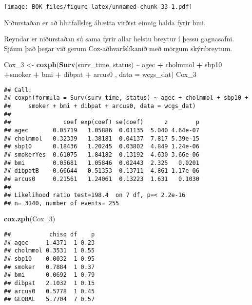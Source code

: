 \documentclass[
]{book}
\newenvironment{Shaded}{\begin{snugshade}}{\end{snugshade}}
\newcommand{\DataTypeTok}[1]{\textcolor[rgb]{0.13,0.29,0.53}{#1}}
\newcommand{\DecValTok}[1]{\textcolor[rgb]{0.00,0.00,0.81}{#1}}
\newcommand{\KeywordTok}[1]{\textcolor[rgb]{0.13,0.29,0.53}{\textbf{#1}}}
\newcommand{\NormalTok}[1]{#1}
\newcommand{\OperatorTok}[1]{\textcolor[rgb]{0.81,0.36,0.00}{\textbf{#1}}}
\newcommand{\StringTok}[1]{\textcolor[rgb]{0.31,0.60,0.02}{#1}}
\begin{document}
\texttt{[image: BOK\_files/figure-latex/unnamed-chunk-33-1.pdf]}

Niðurstaðan er að hlutfallsleg áhætta virðist einnig halda fyrir bmi.

Reyndar er niðurstaðan sú sama fyrir allar helstu breytur í þessu gagnasafni. Sjáum það þegar við gerum Cox-aðhvarfslíkanið með mörgum skýribreytum.

\begin{Shaded}
\begin{Highlighting}[]
\NormalTok{Cox\_}\DecValTok{3}\NormalTok{ <{-}}\StringTok{ }\KeywordTok{coxph}\NormalTok{(}\KeywordTok{Surv}\NormalTok{(surv\_time, status) }\OperatorTok{\textasciitilde{}}\StringTok{  }\NormalTok{agec }\OperatorTok{+}\StringTok{ }\NormalTok{cholmmol }\OperatorTok{+}\StringTok{ }\NormalTok{sbp10 }\OperatorTok{+}\NormalTok{smoker }\OperatorTok{+}\StringTok{ }\NormalTok{bmi  }\OperatorTok{+}\StringTok{ }\NormalTok{dibpat }\OperatorTok{+}\StringTok{ }\NormalTok{arcus0  , }\DataTypeTok{data =}\NormalTok{ wcgs\_dat)}
\NormalTok{Cox\_}\DecValTok{3}
\end{Highlighting}
\end{Shaded}

\begin{verbatim}
## Call:
## coxph(formula = Surv(surv_time, status) ~ agec + cholmmol + sbp10 + 
##     smoker + bmi + dibpat + arcus0, data = wcgs_dat)
## 
##               coef exp(coef) se(coef)      z        p
## agec       0.05719   1.05886  0.01135  5.040 4.64e-07
## cholmmol   0.32339   1.38181  0.04137  7.817 5.39e-15
## sbp10      0.18436   1.20245  0.03802  4.849 1.24e-06
## smokerYes  0.61075   1.84182  0.13192  4.630 3.66e-06
## bmi        0.05681   1.05846  0.02443  2.325   0.0201
## dibpatB   -0.66644   0.51353  0.13711 -4.861 1.17e-06
## arcus0     0.21561   1.24061  0.13223  1.631   0.1030
## 
## Likelihood ratio test=198.4  on 7 df, p=< 2.2e-16
## n= 3140, number of events= 255
\end{verbatim}

\begin{Shaded}
\begin{Highlighting}[]
\KeywordTok{cox.zph}\NormalTok{(Cox\_}\DecValTok{3}\NormalTok{)}
\end{Highlighting}
\end{Shaded}

\begin{verbatim}
##           chisq df    p
## agec     1.4371  1 0.23
## cholmmol 0.3531  1 0.55
## sbp10    0.0032  1 0.95
## smoker   0.7884  1 0.37
## bmi      0.0692  1 0.79
## dibpat   2.1032  1 0.15
## arcus0   0.5778  1 0.45
## GLOBAL   5.7704  7 0.57
\end{verbatim}
\end{document}

